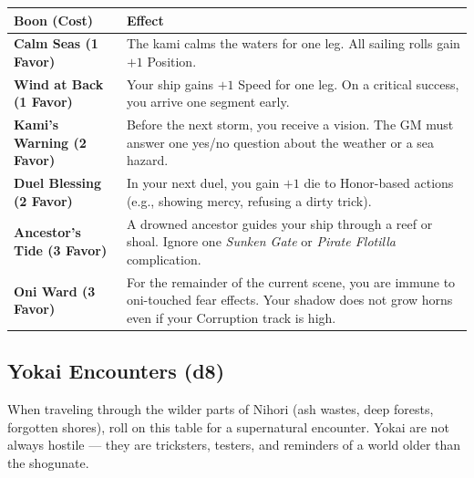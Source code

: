 \begin{longtable}{|p{2cm}|p{10cm}|}
\hline
\rowcolor{gray!20}
\textbf{Boon (Cost)} & \textbf{Effect} \\
\hline
\textbf{Calm Seas (1 Favor)} & The kami calms the waters for one leg. All sailing rolls gain $+1$ Position. \\
\hline
\textbf{Wind at Back (1 Favor)} & Your ship gains $+1$ Speed for one leg. On a critical success, you arrive one segment early. \\
\hline
\textbf{Kami's Warning (2 Favor)} & Before the next storm, you receive a vision. The GM must answer one yes/no question about the weather or a sea hazard. \\
\hline
\textbf{Duel Blessing (2 Favor)} & In your next duel, you gain $+1$ die to Honor-based actions (e.g., showing mercy, refusing a dirty trick). \\
\hline
\textbf{Ancestor's Tide (3 Favor)} & A drowned ancestor guides your ship through a reef or shoal. Ignore one \textit{Sunken Gate} or \textit{Pirate Flotilla} complication. \\
\hline
\textbf{Oni Ward (3 Favor)} & For the remainder of the current scene, you are immune to oni-touched fear effects. Your shadow does not grow horns even if your Corruption track is high. \\
\hline
\end{longtable}

\subsection*{Yokai Encounters (d8)}
\label{sec:nihori-yokai}

When traveling through the wilder parts of Nihori (ash wastes, deep forests, forgotten shores), roll on this table for a supernatural encounter. Yokai are not always hostile --- they are tricksters, testers, and reminders of a world older than the shogunate.

